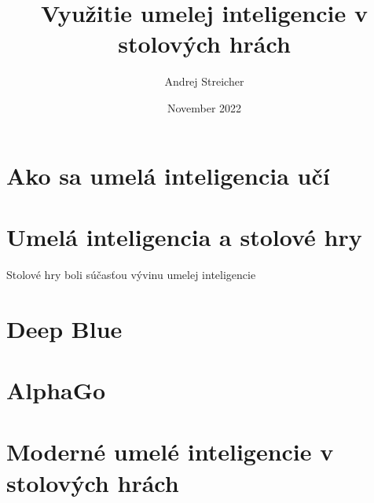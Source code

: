 \documentclass[12pt, a4paper]{report}
\begin{document}
\title{Využitie umelej inteligencie v stolových hrách}
\author{Andrej Streicher}
\date{November 2022}
\maketitle
\tableofcontents
\listoffigures

 
\chapter{Ako sa umelá inteligencia učí}
\chapter{Umelá inteligencia a stolové hry}
Stolové hry boli súčasťou vývinu umelej inteligencie 
\chapter{Deep Blue}
\chapter{AlphaGo}
\chapter{Moderné umelé inteligencie v stolových hrách}
{}

\end{document}
